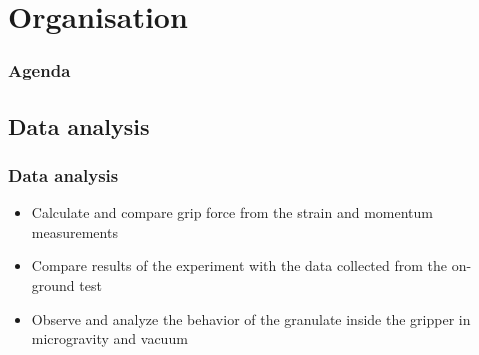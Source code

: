 \documentclass[xcolor=dvipsnames]{beamer}%
\begin{document}
		

\section{Organisation}

\begin{frame}
\frametitle{Agenda}
\tableofcontents[currentsection]
\end{frame}

\subsection{Data analysis}
\begin{frame}
\frametitle{Data analysis}
    \begin{itemize}
    	\item Calculate and compare grip force from the strain and momentum measurements\vspace{3mm}
        \item Compare results of the experiment with the data collected from the on-ground test\vspace{3mm}
        \item Observe and analyze the behavior of the granulate inside the gripper in microgravity and vacuum
     \end{itemize}
\end{frame}



\end{document}
